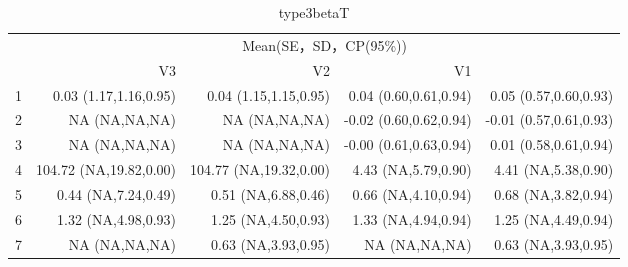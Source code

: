 \begin{table}[h]
\centering
\caption{type3betaT}
\label{tab:type3betaT}
\begin{tabular}{crrrr}
\toprule
      & \multicolumn{4}{c}{Mean(SE，SD，CP(95\%))} \\
\cmidrule{2-5}      & V3    & V2    & V1    &  \\
\midrule
1     & 0.03 (1.17,1.16,0.95) & 0.04 (1.15,1.15,0.95) & 0.04 (0.60,0.61,0.94) & 0.05 (0.57,0.60,0.93) \\
2     & NA (NA,NA,NA) & NA (NA,NA,NA) & -0.02 (0.60,0.62,0.94) & -0.01 (0.57,0.61,0.93) \\
3     & NA (NA,NA,NA) & NA (NA,NA,NA) & -0.00 (0.61,0.63,0.94) & 0.01 (0.58,0.61,0.94) \\
4     & 104.72 (NA,19.82,0.00) & 104.77 (NA,19.32,0.00) & 4.43 (NA,5.79,0.90) & 4.41 (NA,5.38,0.90) \\
5     & 0.44 (NA,7.24,0.49) & 0.51 (NA,6.88,0.46) & 0.66 (NA,4.10,0.94) & 0.68 (NA,3.82,0.94) \\
6     & 1.32 (NA,4.98,0.93) & 1.25 (NA,4.50,0.93) & 1.33 (NA,4.94,0.94) & 1.25 (NA,4.49,0.94) \\
7     & NA (NA,NA,NA) & 0.63 (NA,3.93,0.95) & NA (NA,NA,NA) & 0.63 (NA,3.93,0.95) \\
\bottomrule
\end{tabular}
\end{table}


